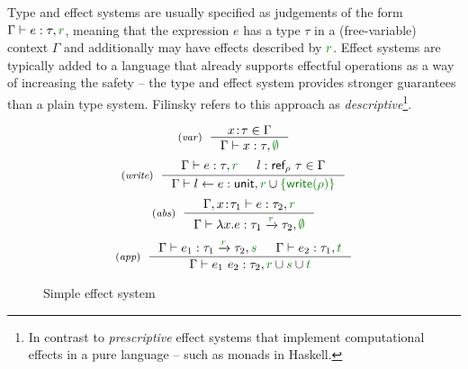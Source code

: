 Type and effect systems are usually specified as judgements of the form $\Gamma \vdash e : \tau, \cclrd{r}$, 
meaning that the expression $e$ has a type $\tau$ in a (free-variable) context $\Gamma$ and 
additionally may have effects described by $\cclrd{r}$. Effect systems are typically added to a 
language that already supports effectful operations as a way of increasing the safety -- the type 
and effect system provides stronger guarantees than a plain type system. Filinsky 
\cite{effects-comprehensive} refers to this approach as \emph{descriptive}\footnote{In contrast 
to \emph{prescriptive} effect systems that implement computational effects in a pure language 
-- such as monads in Haskell.}.


\begin{figure}[t]
\begin{equation*}
\tyrule{var}
  {x\!:\!\tau \in \Gamma }
  {\Gamma \vdash x : \tau, \cclrd{\emptyset} }
\end{equation*}
\begin{equation*}
\tyrule{write}
  {\Gamma \vdash e : \tau, \cclrd{r} & l:\ident{ref}_\rho~\tau\in \Gamma}
  {\Gamma \vdash l \leftarrow e : \ident{unit}, \cclrd{r} \cup \cclrd{\{\ident{write}(\rho)\}} }
\end{equation*}
\begin{equation*}
\tyrule{abs}
  {\Gamma, x\!:\!\tau_1 \vdash e : \tau_2, \cclrd{r} }
  {\Gamma \vdash \lambda x.e : \tau_1 \xrightarrow{\cclrd{r}} \tau_2, \cclrd{\emptyset} }
\end{equation*}
\begin{equation*}
\tyrule{app}
  {\Gamma \vdash e_1 : \tau_1 \xrightarrow{\cclrd{r}} \tau_2, \cclrd{s} &
   \Gamma \vdash e_2 : \tau_1, \cclrd{t} }
  {\Gamma \vdash e_1~e_2 : \tau_2, \cclrd{r} \cup \cclrd{s} \cup \cclrd{t} }
\end{equation*}

\caption{Simple effect system}
\label{fig:path-eff}
\end{figure}



